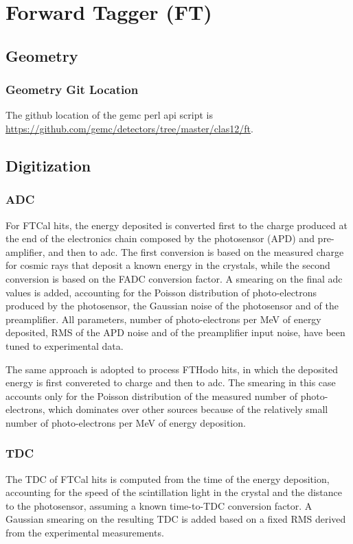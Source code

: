 \section{Forward Tagger (FT)}


\subsection{Geometry}



\subsubsection{Geometry Git Location}
The github location of the gemc perl api script is \url{https://github.com/gemc/detectors/tree/master/clas12/ft}.


\subsection{Digitization}

\subsubsection{ADC}
For FTCal hits, the energy deposited is converted first to the charge produced at the end of the electronics chain composed by the photosensor (APD) and pre-amplifier, and then to adc. The first conversion is based on the measured charge for cosmic rays that deposit a known energy in the crystals, while the second conversion is based on the FADC conversion factor. A smearing on the final adc values is added, accounting for the Poisson distribution of photo-electrons produced by the photosensor, the Gaussian noise of the photosensor and of the preamplifier. All parameters, number of photo-electrons per MeV of energy deposited, RMS of the APD noise and of the preamplifier input noise, have been tuned to experimental data.

The same approach is adopted to process FTHodo hits, in which the deposited energy is first convereted to charge and then to adc. The smearing in this case accounts only for the Poisson distribution of the measured number of photo-electrons, which dominates over other sources because of the relatively small number of photo-electrons per MeV of energy deposition.

\subsubsection{TDC}
The TDC of FTCal hits is computed from the time of the energy deposition, accounting for the speed of the scintillation light in the crystal and the distance to the photosensor, assuming a known time-to-TDC conversion factor. A Gaussian smearing on the resulting TDC is added based on a fixed RMS derived from the experimental measurements.

